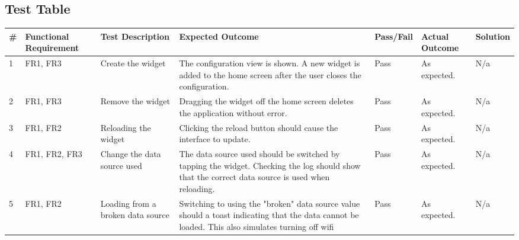 \documentclass[paper=a4, fontsize=11pt]{scrartcl}	%
\numberwithin{equation}{section}															%
\numberwithin{figure}{section}																%
\numberwithin{table}{section}
\begin{document}
\clearpage

\begin{landscape}
\section{Test Table}

\begin{longtable}{|l|p{2cm}|p{5cm}|p{7cm}|l|p{3cm}|p{1.5cm}|}
\hline
\textbf{\#} & \textbf{Functional Requirement} & \textbf{Test Description}                                & \textbf{Expected Outcome}                                                                                                                        & \textbf{Pass/Fail} & \textbf{Actual Outcome} & \textbf{Solution} \\ \hline \hline \endhead
1           & FR1, FR3                        & Create the widget                                        & The configuration view is shown. A new widget is added to the home screen after the user closes the configuration.                               & Pass               & As expected.            & N/a               \\ \hline
2           & FR1, FR3                        & Remove the widget                                        & Dragging the widget off the home screen deletes the application without error.                                                                   & Pass               & As expected.            & N/a               \\ \hline
3           & FR1, FR2                        & Reloading the widget                                     & Clicking the reload button should cause the interface to update.                                                                                 & Pass               & As expected.            & N/a               \\ \hline
4           & FR1, FR2, FR3                   & Change the data source used                              & The data source used should be switched by tapping the widget. Checking the log should show that the correct data source is used when reloading. & Pass               & As expected.            & N/a               \\ \hline
5           & FR1, FR2                        & Loading from a broken data source                        & Switching to using the "broken" data source value should a toast indicating that the data cannot be loaded. This also simulates turning off wifi & Pass               & As expected.            & N/a               \\ \hline

\end{longtable}
\end{landscape}
\end{document}
